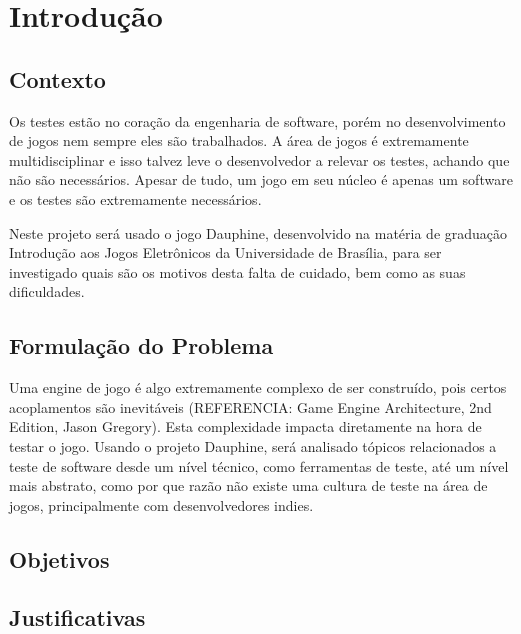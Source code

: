 \chapter[Introdução]{Introdução}

\section{Contexto}

Os testes estão no coração da engenharia de software, porém no desenvolvimento de jogos nem sempre eles são trabalhados. A área de jogos é extremamente multidisciplinar e isso talvez leve o desenvolvedor a relevar os testes, achando que não são necessários. Apesar de tudo, um jogo em seu núcleo é apenas um software e os testes são extremamente necessários.

Neste projeto será usado o jogo Dauphine, desenvolvido na matéria de graduação Introdução aos Jogos Eletrônicos da Universidade de Brasília, para ser investigado quais são os motivos desta falta de cuidado, bem como as suas dificuldades.

\section{Formulação do Problema}

Uma engine de jogo é algo extremamente complexo de ser construído, pois certos acoplamentos são inevitáveis (REFERENCIA: Game Engine Architecture, 2nd Edition, Jason Gregory). Esta complexidade impacta diretamente na hora de testar o jogo. Usando o projeto Dauphine, será analisado tópicos relacionados a teste de software desde um nível técnico, como ferramentas de teste, até um nível mais abstrato, como por que razão não existe uma cultura de teste na área de jogos, principalmente com desenvolvedores indies.

\section{Objetivos}
\section{Justificativas}


